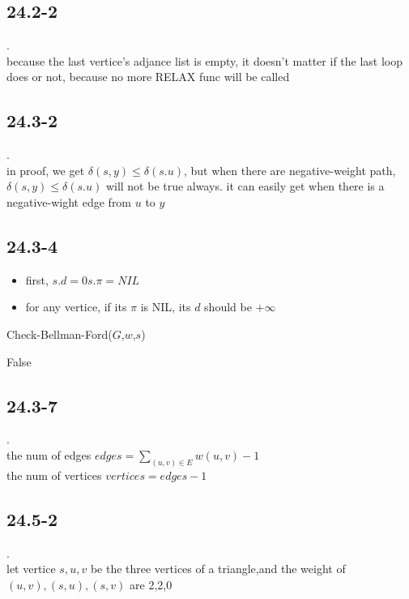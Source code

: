 \documentclass[a4paper,UTF8]{article}
\theoremstyle{definition}
\begin{document}
\subsection*{24.2-2}
.\\
because the last vertice's adjance list is empty, it doesn't matter
if the last loop does or not, because no more RELAX func will be called

\subsection*{24.3-2}
.\\
in proof, we get $\delta(s,y)\le\delta(s.u)$, but when there are negative-weight
path, $\delta(s,y)\le\delta(s.u)$ will not be true always. it can easily get when
there is a negative-wight edge from $u$ to $y$


\subsection*{24.3-4}
\begin{itemize}
  \item first, $s.d=0 s.\pi=NIL$
  \item for any vertice, if its $\pi$ is NIL, its $d$ should be $+\infty$
\end{itemize}
\begin{algorithm}[h]
  \caption{Check-Bellman-Ford($G$,$w$,$s$)}
  \begin{algorithmic}[1]
          \Return False
        \EndIf
    \EndFor
    \EndFor

  \end{algorithmic}
\end{algorithm}

 \subsection*{24.3-7}
.\\
 the num of edges $edges = \sum_{(u,v)\in E} w(u,v)-1$ \\
 the num of vertices $vertices = edges-1  $

 \subsection*{24.5-2}
 .\\
 let vertice $s,u,v$ be the three vertices of a triangle,and the weight of
 $(u,v),(s,u),(s,v)$ are 2,2,0\\
\end{document}
